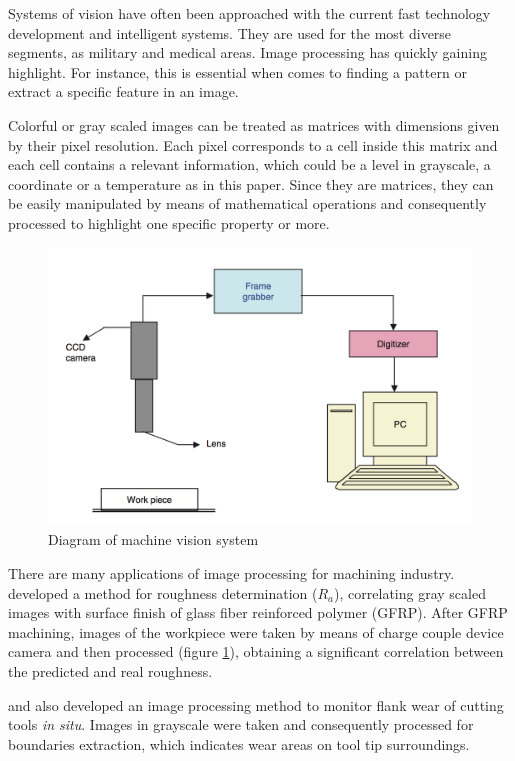 Systems of vision have often been approached with the current fast technology development and intelligent systems. They are used for the most diverse segments, as military and medical areas. Image processing has quickly gaining highlight. For instance, this is essential when comes to finding a pattern or extract a specific feature in an image. 

Colorful or gray scaled images can be treated as matrices with dimensions given by their pixel resolution. Each pixel corresponds to a cell inside this matrix and each cell contains a relevant information, which could be a level in grayscale, a coordinate or a temperature as in this paper. Since they are matrices, they can be easily manipulated by means of mathematical operations and consequently processed to highlight one specific property or more.

\begin{figure}[H]
	\centering
	\captionsetup{justification=centering}
	\includegraphics[scale=0.6]{Imagens/imgPro.png}
	\caption{Diagram of machine vision system \cite{sarma2009surface}}
	\label{fig:imgProcessing}
\end{figure}

There are many applications of image processing for machining industry.  developed a method for roughness determination ($R_{a}$), correlating gray scaled images with surface finish of glass fiber reinforced polymer (GFRP). After GFRP machining, images of the workpiece were taken by means of charge couple device camera and then processed (figure \ref{fig:imgProcessing}), obtaining a significant correlation between the predicted and real roughness.

 and  also developed an image processing method to monitor flank wear of cutting tools \emph{in situ}. Images in grayscale were taken and consequently processed for boundaries extraction, which indicates wear areas on tool tip surroundings.

